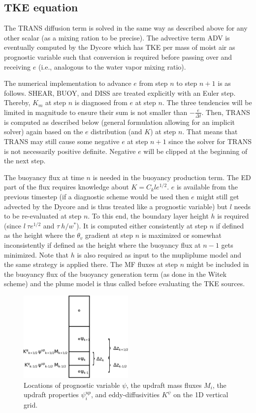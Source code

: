 \documentclass[dvipdfmx,a4paper,10pt]{article}
\begin{document}
\subsection{TKE equation}

The TRANS diffusion term is solved in the same way as described above for any other scalar (as a mixing ration to be precise). The advective term ADV is eventually computed by the Dycore which has TKE per mass of moist air as prognostic variable such that conversion is required before passing over and receiving $e$ (i.e., analogous to the water vapor mixing ratio). 

The numerical implementation to advance $e$ from step $n$ to step $n+1$ is as follows. SHEAR, BUOY, and DISS are treated explicitly with an Euler step. Thereby, $K_m$ at step $n$ is diagnosed from $e$ at step $n$. The three tendencies will be limited in magnitude to ensure their sum is not smaller than $-\frac{e}{\Delta t}$. Then, TRANS is computed as described below (general formulation allowing for an implicit solver) again based on the $e$ distribution (and $K$) at step $n$. That means that TRANS may still cause some negative $e$ at step $n+1$ since the solver for TRANS is not necessarily positive definite. Negative $e$ will be clipped at the beginning of the next step. 

The buoyancy flux at time $n$ is needed in the buoyancy production term. The ED part of the flux requires knowledge about $K=C_k l e^{1/2}$. $e$ is available from the previous timestep (if a diagnostic scheme would be used then $e$ might still get advected by the Dycore and is thus treated like a prognostic variable) but $l$ needs to be re-evaluated at step $n$. To this end, the boundary layer height $h$ is required (since $l~ \tau e^{1/2}$ and $\tau ~ h/w^*$). It is computed either consistently at step $n$ if defined as the height where the $\theta_v$ gradient at step $n$ is maximized or somewhat inconsistently if defined as the height where the buoyancy flux at $n-1$ gets minimized.  Note that $h$ is also required as input to the mupliplume model and the same strategy is applied there. The MF fluxes at step $n$ might be included in the buoyancy flux of the buoyancy generation term (as done in the Witek scheme) and the plume model is thus called before evaluating the TKE sources.


\begin{figure}[bthp]
\centering
 \includegraphics[width=0.5\textwidth]{staggering.eps}
\caption{Locations of prognostic variable $\psi$, the updraft mass fluxes $M_i$, the updraft properties $\psi^{up}_i$, and eddy-diffusivities $K^{\psi}$ on the 1D vertical grid. } \label{fig:staggering}
\end{figure}
\end{document}
